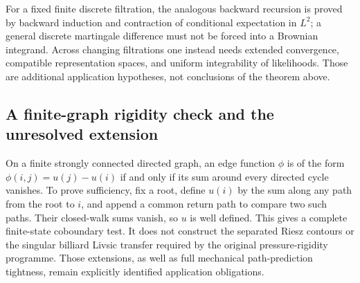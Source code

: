For a fixed finite discrete filtration, the analogous backward recursion is
proved by backward induction and contraction of conditional expectation in
$L^2$; a general discrete martingale difference must not be forced into a
Brownian integrand.  Across changing filtrations one instead needs extended
convergence, compatible representation spaces, and uniform integrability of
likelihoods.  Those are additional application hypotheses, not conclusions
of the theorem above.

\subsection{A finite-graph rigidity check and the unresolved extension}

On a finite strongly connected directed graph, an edge function $\phi$ is of
the form $\phi(i,j)=u(j)-u(i)$ if and only if its sum around every directed
cycle vanishes.  To prove sufficiency, fix a root, define $u(i)$ by the sum
along any path from the root to $i$, and append a common return path to compare
two such paths.  Their closed-walk sums vanish, so $u$ is well defined.
This gives a complete finite-state coboundary test.  It does not construct the
separated Riesz contours or the singular billiard Livsic transfer required
by the original pressure-rigidity programme.  Those extensions, as well as
full mechanical path-prediction tightness, remain explicitly identified
application obligations.
